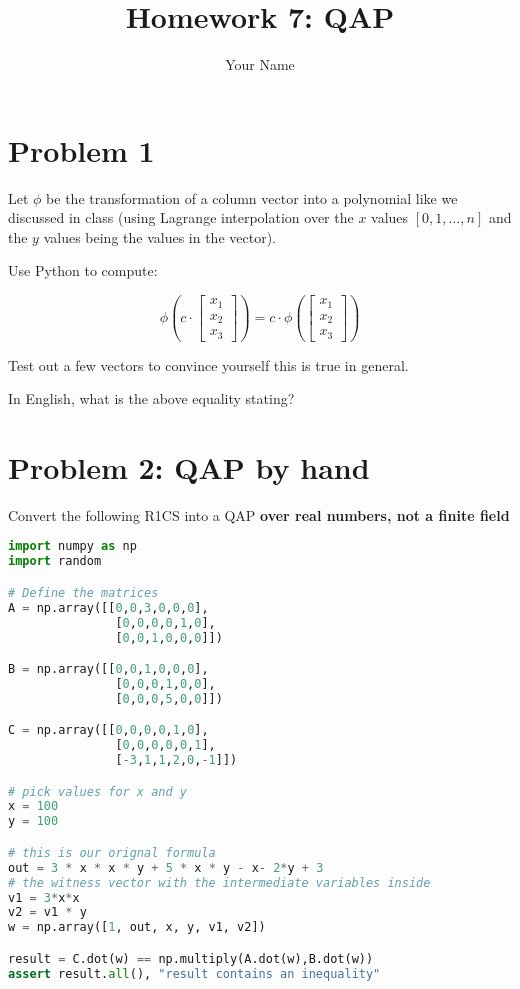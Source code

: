 \documentclass{article}
\title{Homework 7: QAP}
\author{Your Name}
\date{}
\begin{document}
\maketitle

\section{Problem 1}

Let $\phi$ be the transformation of a column vector into a polynomial like we discussed in class (using Lagrange interpolation over the $x$ values $[0, 1, \ldots, n]$ and the $y$ values being the values in the vector).

Use Python to compute:

\[
\phi(c\cdot\begin{bmatrix}x_1\\x_2\\x_3\end{bmatrix}) = c\cdot\phi(\begin{bmatrix}x_1\\x_2\\x_3\end{bmatrix})
\]

Test out a few vectors to convince yourself this is true in general.

In English, what is the above equality stating?

\section{Problem 2: QAP by hand}

Convert the following R1CS into a QAP \textbf{over real numbers, not a finite field}

\begin{lstlisting}[language=Python]
import numpy as np
import random

# Define the matrices
A = np.array([[0,0,3,0,0,0],
               [0,0,0,0,1,0],
               [0,0,1,0,0,0]])

B = np.array([[0,0,1,0,0,0],
               [0,0,0,1,0,0],
               [0,0,0,5,0,0]])

C = np.array([[0,0,0,0,1,0],
               [0,0,0,0,0,1],
               [-3,1,1,2,0,-1]])

# pick values for x and y
x = 100
y = 100

# this is our orignal formula
out = 3 * x * x * y + 5 * x * y - x- 2*y + 3
# the witness vector with the intermediate variables inside
v1 = 3*x*x
v2 = v1 * y
w = np.array([1, out, x, y, v1, v2])

result = C.dot(w) == np.multiply(A.dot(w),B.dot(w))
assert result.all(), "result contains an inequality"
\end{lstlisting}
\end{document}
